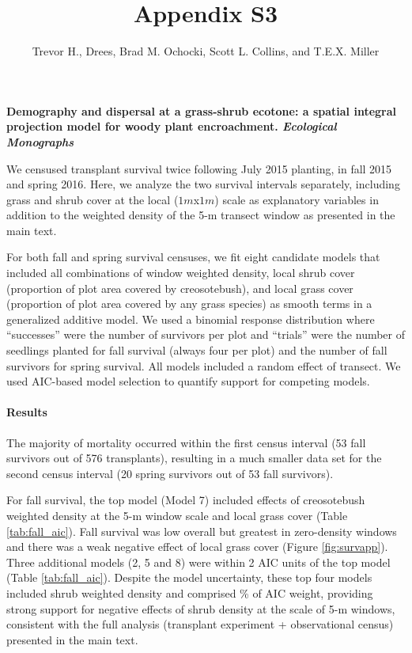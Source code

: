 \documentclass[11pt]{article}\usepackage[]{graphicx}\usepackage[usenames,dvipsnames]{xcolor}
\title{Appendix S3}
\author{Trevor H., Drees, Brad M. Ochocki, Scott L. Collins, and T.E.X. Miller}
\date{\vspace{-5ex}}
\begin{document}
\maketitle
\noindent{} \textbf{Demography and dispersal at a grass-shrub ecotone: a spatial integral projection model for woody plant encroachment. \textit{Ecological Monographs}}

\renewcommand{\thefigure}{S\arabic{figure}}\setcounter{figure}{0}
\renewcommand{\thetable}{S\arabic{table}}\setcounter{table}{0}
\renewcommand{\theequation}{S\arabic{equation}}\setcounter{equation}{0}

We censused transplant survival twice following July 2015 planting, in fall 2015 and spring 2016. 
Here, we analyze the two survival intervals separately, including grass and shrub cover at the local ($1m$x$1m$) scale as explanatory variables in addition to the weighted density of the 5-m transect window as presented in the main text. 

For both fall and spring survival censuses, we fit eight candidate models that included all combinations of window weighted density, local shrub cover (proportion of plot area covered by creosotebush), and local grass cover (proportion of plot area covered by any grass species) as smooth terms in a generalized additive model.
We used a binomial response distribution where ``successes'' were the number of survivors per plot and ``trials'' were the number of seedlings planted for fall survival (always four per plot) and the number of fall survivors for spring survival. 
All models included a random effect of transect. 
We used AIC-based model selection to quantify support for competing models. 

\paragraph{Results}The majority of mortality occurred within the first census interval (53 fall survivors out of 576 transplants), resulting in a much smaller data set for the second census interval (20 spring survivors out of 53 fall survivors).

For fall survival, the top model (Model 7) included effects of creosotebush weighted density at the 5-m window scale and local grass cover (Table \ref{tab:fall_aic}). 
Fall survival was low overall but greatest in zero-density windows and there was a weak negative effect of local grass cover (Figure \ref{fig:survapp}).
Three additional models (2, 5 and 8) were within 2 AIC units of the top model (Table \ref{tab:fall_aic}). 
Despite the model uncertainty, these top four models included shrub weighted density and comprised \% of AIC weight, providing strong support for negative effects of shrub density at the scale of 5-m windows, consistent with the full analysis (transplant experiment + observational census) presented in the main text.
\end{document}
